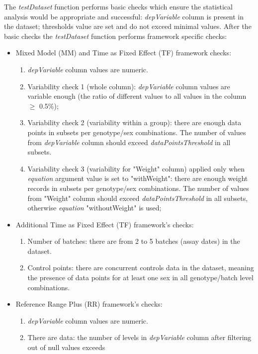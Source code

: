 \documentclass[a4paper]{article}
\begin{document}
The \textit{testDataset} function performs basic checks which ensure the statistical analysis would be appropriate
and successful: \textit{depVariable} column is present in the dataset; thresholds value are set and do not exceed
minimal values.
\newline\newline
After the basic checks the \textit{testDataset} function performs framework specific checks:
\begin{itemize}
\item Mixed Model (MM) and Time as Fixed Effect (TF) framework checks:
\begin{enumerate}
\item \textit{depVariable} column values are numeric.
\item Variability check 1  (whole column): \textit{depVariable} column values are variable enough
(the ratio of different values to all values in the column $\geq$ 0.5\%);
\item Variability check 2 (variability within a group): there are enough data points in subsets per genotype/sex
combinations. The number of values from \textit{depVariable} column should exceed \textit{dataPointsThreshold}
in all subsets.
\item Variability check 3 (variability for "Weight" column) applied only when \textit{equation} argument value is
set to "withWeight": there are enough weight records in subsets per genotype/sex combinations. The number of values
from "Weight" column should exceed \textit{dataPointsThreshold} in all subsets, otherwise \textit{equation}
"withoutWeight" is used;
\end{enumerate}
\item Additional Time as Fixed Effect (TF) framework's checks:
\begin{enumerate}
\item Number of batches: there are from 2 to 5 batches (assay dates) in the dataset.
\item Control points: there are concurrent controls data in the dataset, meaning the presence of data points for
at least one sex in all genotype/batch level combinations.
\end{enumerate}
\item Reference Range Plus (RR) framework's checks:
\begin{enumerate}
\item \textit{depVariable} column values are numeric.
\item There are data: the number of levels in \textit{depVariable} column after filtering out of null values exceeds

\end{enumerate}
\end{itemize}
\end{document}
